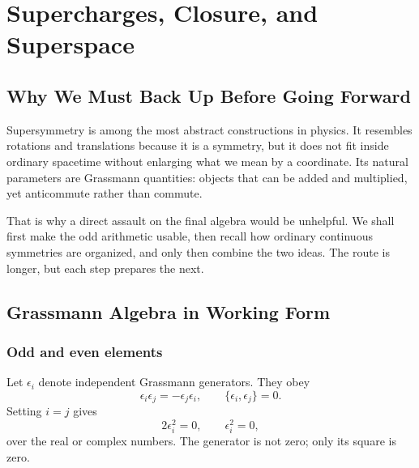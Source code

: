 \chapter{Supercharges, Closure, and Superspace}


\section{Why We Must Back Up Before Going Forward}

Supersymmetry is among the most abstract constructions in physics. It resembles rotations and translations because it is a symmetry, but it does not fit inside ordinary spacetime without enlarging what we mean by a coordinate. Its natural parameters are Grassmann quantities: objects that can be added and multiplied, yet anticommute rather than commute.

That is why a direct assault on the final algebra would be unhelpful. We shall first make the odd arithmetic usable, then recall how ordinary continuous symmetries are organized, and only then combine the two ideas. The route is longer, but each step prepares the next.

\section{Grassmann Algebra in Working Form}

\subsection{Odd and even elements}

Let \(\epsilon_i\) denote independent Grassmann generators. They obey
\begin{equation}
\epsilon_i\epsilon_j=-\epsilon_j\epsilon_i,
\qquad
\{\epsilon_i,\epsilon_j\}=0.
\end{equation}
Setting \(i=j\) gives
\begin{equation}
2\epsilon_i^2=0,
\qquad
\epsilon_i^2=0,
\end{equation}
over the real or complex numbers. The generator is not zero; only its square is zero.

